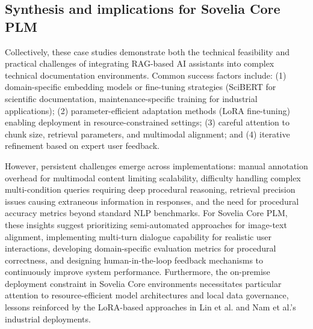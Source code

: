 \subsection{Synthesis and implications for Sovelia Core PLM}

Collectively, these case studies demonstrate both the technical feasibility and practical challenges of integrating RAG-based AI assistants into complex technical documentation environments. Common success factors include: (1) domain-specific embedding models or fine-tuning strategies (SciBERT for scientific documentation, maintenance-specific training for industrial applications); (2) parameter-efficient adaptation methods (LoRA fine-tuning) enabling deployment in resource-constrained settings; (3) careful attention to chunk size, retrieval parameters, and multimodal alignment; and (4) iterative refinement based on expert user feedback.

However, persistent challenges emerge across implementations: manual annotation overhead for multimodal content limiting scalability, difficulty handling complex multi-condition queries requiring deep procedural reasoning, retrieval precision issues causing extraneous information in responses, and the need for procedural accuracy metrics beyond standard NLP benchmarks. For Sovelia Core PLM, these insights suggest prioritizing semi-automated approaches for image-text alignment, implementing multi-turn dialogue capability for realistic user interactions, developing domain-specific evaluation metrics for procedural correctness, and designing human-in-the-loop feedback mechanisms to continuously improve system performance. Furthermore, the on-premise deployment constraint in Sovelia Core environments necessitates particular attention to resource-efficient model architectures and local data governance, lessons reinforced by the LoRA-based approaches in Lin et al. and Nam et al.'s industrial deployments.

